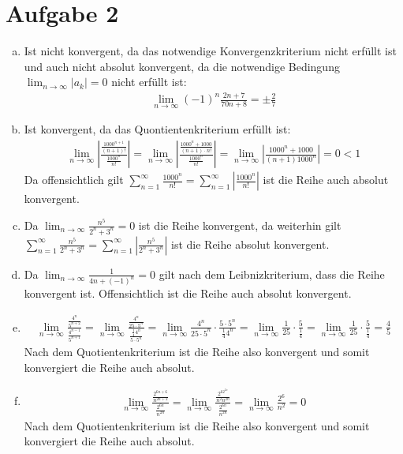 \documentclass[10pt,a4paper,parskip=half]{scrartcl}
\begin{document}
\section*{Aufgabe 2}
\begin{enumerate}[a)]
	\item 
	Ist nicht konvergent, da das notwendige Konvergenzkriterium nicht erfüllt ist und auch nicht absolut konvergent, da die notwendige Bedingung $\lim_{n\to\infty} |a_k| = 0$ nicht erfüllt ist:
		\begin{align*} 
			\lim_{n \to \infty} (-1)^n\frac{2n+7}{70n + 8} = \pm \frac 27 
		\end{align*}
         \item 
         Ist konvergent, da das Quontientenkriterium erfüllt ist:
            \begin{align*} 
               \lim_{n \to \infty} \left|\frac{\frac{1000^{n+1}}{(n+1)!}}{\frac{1000^n}{n!}}\right| = \lim_{n \to \infty} \left|\frac{\frac{1000^{n} + 1000}{(n+1) \cdot n!}}{\frac{1000^n}{n!}}\right| = \lim_{n \to \infty} \left|\frac{1000^{n} + 1000}{(n+1) 1000^n}\right| = 0 < 1
            \end{align*}
         Da offensichtlich gilt $\sum_{n=1}^{\infty}\frac{1000^n}{n!} =  \sum_{n=1}^{\infty}\left|\frac{1000^n}{n!}\right|$  ist die Reihe auch absolut konvergent.
         \item 
         Da $\lim_{n \to \infty} \frac{n^5}{2^n+3^n} = 0$ ist die Reihe konvergent, da weiterhin gilt $\sum_{n=1}^{\infty}\frac{n^5}{2^n+3^n}  =  \sum_{n=1}^{\infty}\left|\frac{n^5}{2^n+3^n}\right|$ ist die Reihe absolut konvergent.
         \item 
         Da $\lim_{n \to \infty} \frac{1}{4n + (-1)^n} = 0$ gilt nach dem Leibnizkriterium, dass die Reihe konvergent ist. Offensichtlich ist die Reihe auch absolut konvergent.
\item
\begin{align*}
\lim_{n\to\infty} \frac{\frac{4^{n}}{5^{n+2}}}{\frac{4^{n-1}}{5^{n+1}}} = \lim_{n\to\infty} \frac{\frac{4^{n}}{25\cdot5^{n}}}{\frac{\frac 1 4 4^{n}}{5\cdot5^{n}}} = \lim_{n\to\infty}\frac{4^{n}}{25\cdot5^{n}} \cdot \frac{5\cdot5^{n}}{\frac 1 4 4^{n}} = \lim_{n\to\infty}\frac{1}{25} \cdot \frac{5}{\frac 1 4} = \lim_{n\to\infty}\frac{1}{25} \cdot \frac{5}{\frac 1 4} = \frac 4 5
\end{align*}
Nach dem Quotientenkriterium ist die Reihe also konvergent und somit konvergiert die Reihe auch absolut.
\item
\begin{align*}
\lim_{n\to\infty} \frac{\frac{2^{6n+6}}{n^{2n+2}}}{\frac{2^{6n}}{n^{2n}}} = \lim_{n\to\infty} \frac{\frac{2^62^{6n}}{n^2n^{2n}}}{\frac{2^{6n}}{n^{2n}}} = \lim_{n\to\infty} \frac{2^6}{n^2} = 0 
\end{align*}
Nach dem Quotientenkriterium ist die Reihe also konvergent und somit konvergiert die Reihe auch absolut.
\end{enumerate}
\end{document}
